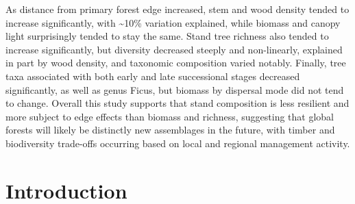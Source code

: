 \documentclass[
  12pt,
]{article}
\begin{document}
As distance from primary forest edge increased, stem and wood density tended to increase significantly, with \textasciitilde10\% variation explained, while biomass and canopy light surprisingly tended to stay the same.
Stand tree richness also tended to increase significantly, but diversity decreased steeply and non-linearly, explained in part by wood density, and taxonomic composition varied notably.
Finally, tree taxa associated with both early and late successional stages decreased significantly, as well as genus Ficus, but biomass by dispersal mode did not tend to change.
Overall this study supports that stand composition is less resilient and more subject to edge effects than biomass and richness, suggesting that global forests will likely be distinctly new assemblages in the future, with timber and biodiversity trade-offs occurring based on local and regional management activity.

\newpage

\hypertarget{introduction}{%
\section{Introduction}\label{introduction}}
\end{document}
